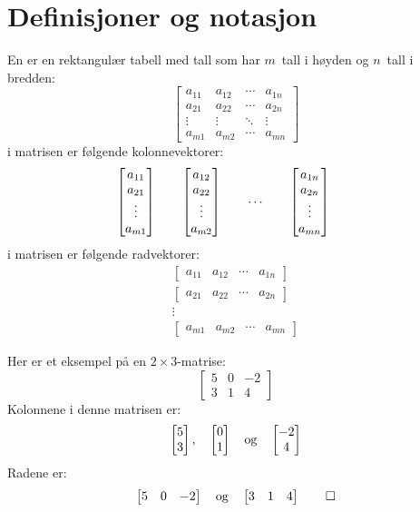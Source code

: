 

\label{ch:matriser}


\section*{Definisjoner og notasjon}

En  er en rektangulær tabell med tall
som har $m$~tall i høyden og $n$~tall i bredden:
\[
\begin{bmatrix}
a_{11} & a_{12} & \cdots & a_{1n} \\
a_{21} & a_{22} & \cdots & a_{2n} \\
\vdots & \vdots & \ddots & \vdots \\
a_{m1} & a_{m2} & \cdots & a_{mn}
\end{bmatrix}
\]
 i matrisen er følgende kolonnevektorer:
\[
\begin{bmatrix} a_{11} \\ a_{21} \\ \vdots \\ a_{m1} \end{bmatrix}\qquad
\begin{bmatrix} a_{12} \\ a_{22} \\ \vdots \\ a_{m2} \end{bmatrix}\qquad
\cdots\qquad
\begin{bmatrix} a_{1n} \\ a_{2n} \\ \vdots \\ a_{mn} \end{bmatrix}\qquad
\]
 i matrisen er følgende radvektorer:
\begin{gather*}
\begin{bmatrix}
a_{11} & a_{12} & \cdots & a_{1n}
\end{bmatrix}
\\
\begin{bmatrix}
a_{21} & a_{22} & \cdots & a_{2n}
\end{bmatrix}
\\
\vdots
\\
\begin{bmatrix}
a_{m1} & a_{m2} & \cdots & a_{mn}
\end{bmatrix}
\end{gather*}

\begin{ex}
Her er et eksempel på en $2 \times 3$-matrise:
\[
\begin{bmatrix}
5 & 0 & -2 \\
3 & 1 &  4
\end{bmatrix}
\]
Kolonnene i denne matrisen er:
\[
\begin{bmatrix} 5 \\ 3 \end{bmatrix},\quad
\begin{bmatrix} 0 \\ 1 \end{bmatrix}\quad\text{og}\quad
\begin{bmatrix} -2 \\ 4 \end{bmatrix}
\]
Radene er:
\[
\begin{bmatrix}
5 & 0 & -2
\end{bmatrix}
\quad\text{og}\quad
\begin{bmatrix}
3 & 1 &  4
\end{bmatrix}
\qedhere
\]
\end{ex}


